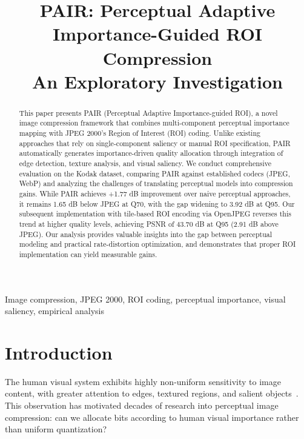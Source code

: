 \documentclass[conference]{IEEEtran}
\begin{document}
\title{PAIR: Perceptual Adaptive Importance-Guided ROI Compression\\An Exploratory Investigation}

\author{
}

\maketitle

\begin{abstract}
This paper presents PAIR (Perceptual Adaptive Importance-guided ROI), a novel image compression framework that combines multi-component perceptual importance mapping with JPEG 2000's Region of Interest (ROI) coding. Unlike existing approaches that rely on single-component saliency or manual ROI specification, PAIR automatically generates importance-driven quality allocation through integration of edge detection, texture analysis, and visual saliency. We conduct comprehensive evaluation on the Kodak dataset, comparing PAIR against established codecs (JPEG, WebP) and analyzing the challenges of translating perceptual models into compression gains. While PAIR achieves +1.77 dB improvement over naive perceptual approaches, it remains 1.65 dB below JPEG at Q70, with the gap widening to 3.92 dB at Q95. Our subsequent implementation with tile-based ROI encoding via OpenJPEG reverses this trend at higher quality levels, achieving PSNR of 43.70 dB at Q95 (2.91 dB above JPEG). Our analysis provides valuable insights into the gap between perceptual modeling and practical rate-distortion optimization, and demonstrates that proper ROI implementation can yield measurable gains.
\end{abstract}

\begin{IEEEkeywords}
Image compression, JPEG 2000, ROI coding, perceptual importance, visual saliency, empirical analysis
\end{IEEEkeywords}

\section{Introduction}

The human visual system exhibits highly non-uniform sensitivity to image content, with greater attention to edges, textured regions, and salient objects~\cite{wang2004image}. This observation has motivated decades of research into perceptual image compression: can we allocate bits according to human visual importance rather than uniform quantization?
\end{document}
